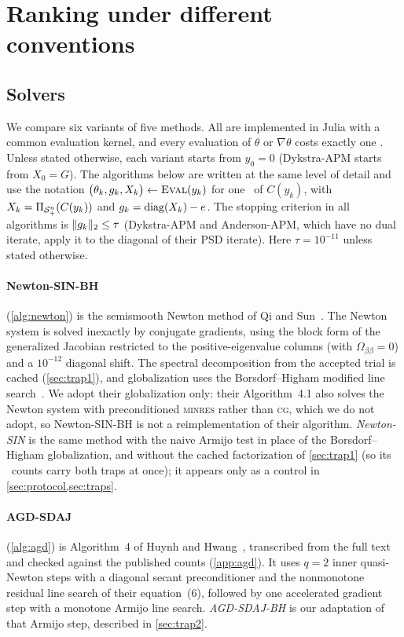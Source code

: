 \section{Ranking under different conventions}\label{sec:ranking}

\subsection{Solvers}\label{sec:solvers}
We compare six variants of five methods. All are implemented in Julia with
a common evaluation kernel, and every evaluation of $\theta$ or
$\nabla\theta$ costs exactly one \EVD. Unless stated otherwise, each variant
starts from $y_0=0$ (Dykstra-APM starts from $X_0=G$). The algorithms below
are written at the same level of detail and use the notation
$\bigl(\theta_k,g_k,X_k\bigr)\leftarrow\textsc{Eval}(y_k)$ for one \EVD\ of
$C(y_k)$, with $X_k=\Pi_{\mathcal{S}_+^n}(C(y_k))$ and $g_k=\operatorname{diag}(X_k)-e$. The stopping
criterion in all algorithms is $\lVert g_k\rVert_2\le\tau$ (Dykstra-APM and
Anderson-APM, which have no dual iterate, apply it to the diagonal of their
PSD iterate). Here $\tau=10^{-11}$ unless stated otherwise.

\paragraph{Newton-SIN-BH} (\cref{alg:newton}) is the semismooth Newton
method of Qi and Sun~\cite{qisun2006quadratically}. The Newton system is solved inexactly by
conjugate gradients, using the block form of the generalized Jacobian
restricted to the positive-eigenvalue columns (with
$\Omega_{\beta\beta}=0$) and a $10^{-12}$ diagonal shift. The spectral
decomposition from the accepted trial is cached (\cref{sec:trap1}), and
globalization uses the Borsdorf--Higham modified line
search~\cite[Alg.~4.1, Step~6]{borsdorf2010preconditioned}. We adopt their
globalization only: their Algorithm~4.1 also solves the Newton system with
preconditioned \textsc{minres} rather than \textsc{cg}, which we do not
adopt, so Newton-SIN-BH is not a reimplementation of their
algorithm. \emph{Newton-SIN} is the same method with the
naive Armijo test in place of the Borsdorf--Higham globalization, and
without the cached factorization of \cref{sec:trap1} (so its \EVD\ counts
carry both traps at once); it appears only as a control in
\cref{sec:protocol,sec:traps}.

\paragraph{AGD-SDAJ} (\cref{alg:agd}) is Algorithm~4 of Huynh and
Hwang~\cite{huynh2025accelerated}, transcribed from the full text and checked against
the published counts (\cref{app:agd}). It uses $q=2$ inner quasi-Newton steps
with a diagonal secant preconditioner and the nonmonotone residual line search
of their equation~(6), followed by one accelerated gradient step with a
monotone Armijo line search. \emph{AGD-SDAJ-BH} is our adaptation of that
Armijo step, described in \cref{sec:trap2}.

